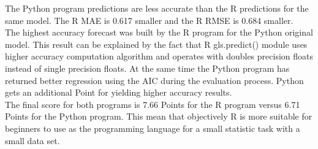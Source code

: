 \documentclass [twoside,
  11pt, a4paper,
  footinclude=true,
  headinclude=true,
  cleardoublepage=empty
]{article}
\begin{document}
The Python program predictions are less accurate than the R predictions for the same model. The R MAE is 0.617 smaller and the R RMSE is 0.684 smaller.\\
The highest accuracy forecast was built by the R program for the Python original model. This result can be explained by the fact that R gls.predict() module uses higher accuracy computation algorithm and operates with doubles precision floats instead of single precision floats. At the same time the Python program has returned better regression using the AIC during the evaluation process. Python gets an additional Point for yielding higher accuracy results.\\
The final score for both programs is 7.66 Points for the R program versus 6.71 Points for the Python program. This mean that objectively R is more suitable for beginners to use as the programming language for a small statistic task with a small data set.
\end{document}
